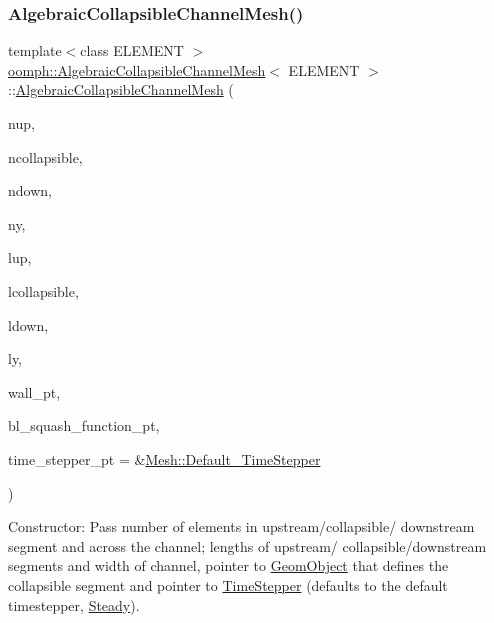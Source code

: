 \subsubsection{\texorpdfstring{Algebraic\+Collapsible\+Channel\+Mesh()}{AlgebraicCollapsibleChannelMesh()}\hspace{0.1cm}{\footnotesize\ttfamily [2/2]}}
{\footnotesize\ttfamily template$<$class E\+L\+E\+M\+E\+NT $>$ \\
\hyperlink{classoomph_1_1AlgebraicCollapsibleChannelMesh}{oomph\+::\+Algebraic\+Collapsible\+Channel\+Mesh}$<$ E\+L\+E\+M\+E\+NT $>$\+::\hyperlink{classoomph_1_1AlgebraicCollapsibleChannelMesh}{Algebraic\+Collapsible\+Channel\+Mesh} (\begin{DoxyParamCaption}\item[{const unsigned \&}]{nup,  }\item[{const unsigned \&}]{ncollapsible,  }\item[{const unsigned \&}]{ndown,  }\item[{const unsigned \&}]{ny,  }\item[{const double \&}]{lup,  }\item[{const double \&}]{lcollapsible,  }\item[{const double \&}]{ldown,  }\item[{const double \&}]{ly,  }\item[{\hyperlink{classoomph_1_1GeomObject}{Geom\+Object} $\ast$}]{wall\+\_\+pt,  }\item[{\hyperlink{classoomph_1_1CollapsibleChannelDomain_a2bf1d7943bfac134a5c27a54c7e1faed}{Collapsible\+Channel\+Domain\+::\+B\+L\+Squash\+Fct\+Pt}}]{bl\+\_\+squash\+\_\+function\+\_\+pt,  }\item[{\hyperlink{classoomph_1_1TimeStepper}{Time\+Stepper} $\ast$}]{time\+\_\+stepper\+\_\+pt = {\ttfamily \&\hyperlink{classoomph_1_1Mesh_a12243d0fee2b1fcee729ee5a4777ea10}{Mesh\+::\+Default\+\_\+\+Time\+Stepper}} }\end{DoxyParamCaption})\hspace{0.3cm}{\ttfamily [inline]}}



Constructor\+: Pass number of elements in upstream/collapsible/ downstream segment and across the channel; lengths of upstream/ collapsible/downstream segments and width of channel, pointer to \hyperlink{classoomph_1_1GeomObject}{Geom\+Object} that defines the collapsible segment and pointer to \hyperlink{classoomph_1_1TimeStepper}{Time\+Stepper} (defaults to the default timestepper, \hyperlink{classoomph_1_1Steady}{Steady}). 



